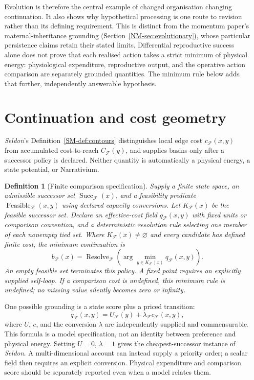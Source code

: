 \documentclass[11pt,a4paper]{article}
\newtheorem{definition}{Definition}[section]
\theoremstyle{remark}
\newcommand{\Frame}{\mathcal F}
\begin{document}
Evolution is therefore the central example of changed organisation changing
continuation. It also shows why hypothetical processing is one route to
revision rather than its defining requirement. This is distinct from the
momentum paper's maternal-inheritance grounding
(Section~\ref{NM-sec:evolutionary}), whose particular persistence claims
retain their stated limits. Differential reproductive success alone does
not prove that each realised action takes a strict minimum of physical
energy: physiological expenditure, reproductive output, and the operative
action comparison are separately grounded quantities. The minimum rule
below adds that further, independently answerable hypothesis.

\section{Continuation and cost geometry}\label{sec:cost-geometry}

\emph{Seldon}'s Definition~\ref{SM-def:contours} distinguishes local edge cost
\(c_{\Frame}(x,y)\) from accumulated cost-to-reach \(C_{\Frame}(y)\), and
supplies basins only after a successor policy is declared. Neither quantity
is automatically a physical energy, a state potential, or Narrativium.

\begin{definition}[Finite comparison specification]\label{def:finite-policy}
Supply a finite state space, an admissible successor set
\(\operatorname{Succ}_{\Frame}(x)\), and a feasibility predicate
\(\operatorname{Feasible}_{\Frame}(x,y)\) using declared capacity conversions.
Let \(K_{\Frame}(x)\) be the feasible successor set. Declare an effective-cost
field \(q_{\Frame}(x,y)\) with fixed units or comparison convention, and a
deterministic resolution rule selecting one member of each nonempty tied set.
Where \(K_{\Frame}(x)\ne\varnothing\) and every candidate has defined finite
cost, the minimum continuation is
\[
b_{\Frame}(x)=\operatorname{Resolve}_{\Frame}\!\left(
\arg\min_{y\in K_{\Frame}(x)}q_{\Frame}(x,y)\right).
\]
An empty feasible set terminates this policy. A fixed point requires an
explicitly supplied self-loop. If a comparison cost is undefined, this
minimum rule is undefined; no missing value silently becomes zero or infinity.
\end{definition}

One possible grounding is a state score plus a priced transition:
\[
q_{\Frame}(x,y)=U_{\Frame}(y)+\lambda_{\Frame}c_{\Frame}(x,y),
\]
where \(U\), \(c\), and the conversion \(\lambda\) are independently supplied
and commensurable. This formula is a model specification, not an identity
between preference and physical energy. Setting \(U=0\), \(\lambda=1\) gives
the cheapest-successor instance of \emph{Seldon}. A multi-dimensional account
can instead supply a priority order; a scalar field then requires an explicit
conversion. Physical expenditure and comparison score should be separately
reported even when a model relates them.
\end{document}
